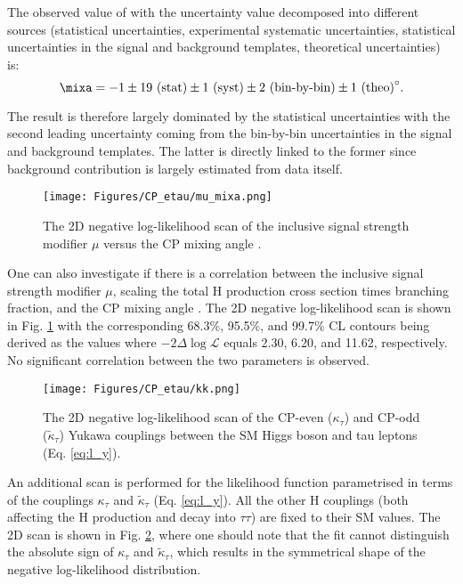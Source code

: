 The observed value of \mixa with the uncertainty value decomposed into different sources (statistical uncertainties, experimental systematic uncertainties, statistical uncertainties in the signal and background templates, theoretical uncertainties) is:
\begin{equation}
    \mixa = -1 \pm 19 ~\text{(stat)} \pm 1 ~\text{(syst)} \pm 2 ~\text{(bin-by-bin)} \pm 1 ~\text{(theo)}^\circ.
\end{equation}

The result is therefore largely dominated by the statistical uncertainties with the second leading uncertainty coming from the bin-by-bin uncertainties in the signal and background templates. The latter is directly linked to the former since background contribution is largely estimated from data itself.

\begin{figure}[h!]
    \centering
    \texttt{[image: Figures/CP\_etau/mu\_mixa.png]}
    \caption{The 2D negative log-likelihood scan of the inclusive signal strength modifier $\mu$ versus the CP mixing angle \mixa.}
    \label{fig:mu_mixa}
\end{figure}

One can also investigate if there is a correlation between the inclusive signal strength modifier $\mu$, scaling the total H production cross section times \htt branching fraction, and the CP mixing angle \mixa. The 2D negative log-likelihood scan is shown in Fig. \ref{fig:mu_mixa} with the corresponding 68.3\%, 95.5\%, and 99.7\% CL contours being derived as the values where $-2\Delta\log\mathcal{L}$ equals 2.30, 6.20, and 11.62, respectively. No significant correlation between the two parameters is observed.

\begin{figure}[h!]
    \centering
    \texttt{[image: Figures/CP\_etau/kk.png]}
    \caption{The 2D negative log-likelihood scan of the CP-even ($\kappa_\tau$) and CP-odd ($\tilde{\kappa}_\tau$) Yukawa couplings between the SM Higgs boson and tau leptons (Eq. \ref{eq:l_y}).}
    \label{fig:kk}
\end{figure}

An additional scan is performed for the likelihood function parametrised in terms of the couplings $\kappa_\tau$ and $\tilde{\kappa}_\tau$ (Eq. \ref{eq:l_y}). All the other H couplings (both affecting the H production and decay into $\tau\tau$) are fixed to their SM values. The 2D scan is shown in Fig. \ref{fig:kk}, where one should note that the fit cannot distinguish the absolute sign of $\kappa_\tau$ and $\tilde{\kappa}_\tau$, which results in the symmetrical shape of the negative log-likelihood distribution.

